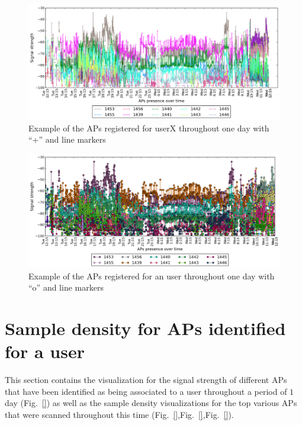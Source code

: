 \begin{figure}[h]
\centering
\includegraphics[height =
0.45\textwidth]{figures/cros_line_user_6_sorted_1days_plot.png}
\caption{Example of the APs registered for userX throughout one day with
``+'' and line markers}
\label{user_6_cross_line_1d}
\end{figure}

\begin{figure}[h]
\centering
\includegraphics[height =
0.45\textwidth]{figures/o_line_user_6_sorted_1days_plot.png}
\caption{Example of the APs registered for an user throughout one day with
``o'' and line markers}
\label{user_6_o_line_1d}
\end{figure}

\section{Sample density for APs identified for a user}
\label{appendix_sample_density}

This section contains the visualization for the signal strength of different APs
that have been identified as being associated to a user throughout a period of
$1$ day (Fig.~\ref{}) as well as the sample density visualizations for the top
various APs that were scanned throughout this time
(Fig.~\ref{},Fig.~\ref{},Fig.~\ref{}).

